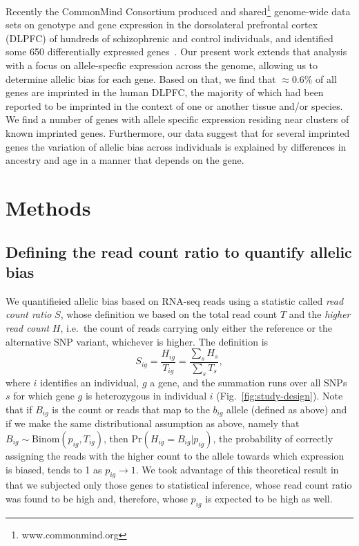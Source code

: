 \documentclass[letterpaper]{article}
\begin{document}
Recently the CommonMind Consortium produced and
shared\footnote{www.commonmind.org} genome-wide data sets on genotype and gene
expression in the dorsolateral prefrontal cortex (DLPFC) of hundreds of
schizophrenic and control individuals, and identified some 650 differentially
expressed genes~\cite{Fromer2016a}. Our present work extends that analysis
with a focus on allele-specfic expression across the genome, allowing us to
determine allelic bias for each gene.  Based on that, we find that \(\approx
0.6\%\) of all genes are imprinted in the human DLPFC, the majority of which
had been reported to be imprinted in the context of one or another tissue
and/or species. We find a number of genes with allele specific expression
residing near clusters of known imprinted genes. Furthermore, our data suggest
that for several imprinted genes the variation of allelic bias across
individuals is explained by differences in {ancestry and} age in a manner that
depends on the gene.

\section{Methods}

\subsection{Defining the read count ratio to quantify allelic bias}

We quantifieied allelic bias based on RNA-seq reads using a statistic called
\emph{read count ratio} \(S\), whose definition we
based on the total read count \(T\) and the \emph{higher read count} \(H\),
i.e.~the count of reads carrying only either the reference or the alternative SNP variant,
whichever is higher.  The
definition is
\begin{equation}
S_{ig} = \frac{H_{ig}}{T_{ig}}= \frac{\sum_s H_s}{\sum_sT_s},
\label{eq:S-definition}
\end{equation}
where \(i\) identifies an individual, \(g\) a gene, and the summation runs
over all SNPs \(s\) for which gene \(g\) is heterozygous in individual \(i\) (Fig.~\ref{fig:study-design}).
Note that if \(B_{ig}\) is the count or reads that map to the \(b_{ig}\) allele
(defined as above) and if we make the same distributional assumption as above, namely that \(B_{ig}\sim
\mathrm{Binom}(p_{ig}, T_{ig})\), then \(\mathrm{Pr}(H_{ig}=B_{ig}|p_{ig})\), the probability of correctly
assigning the reads with the higher count to the allele towards which
expression is biased, tends to 1 as \(p_{ig} \rightarrow 1\).  We took
advantage of this theoretical result in that we subjected only those genes to
statistical inference, whose read count ratio was found to be high and,
therefore, whose \(p_{ig}\) is expected to be high as well.
\end{document}
